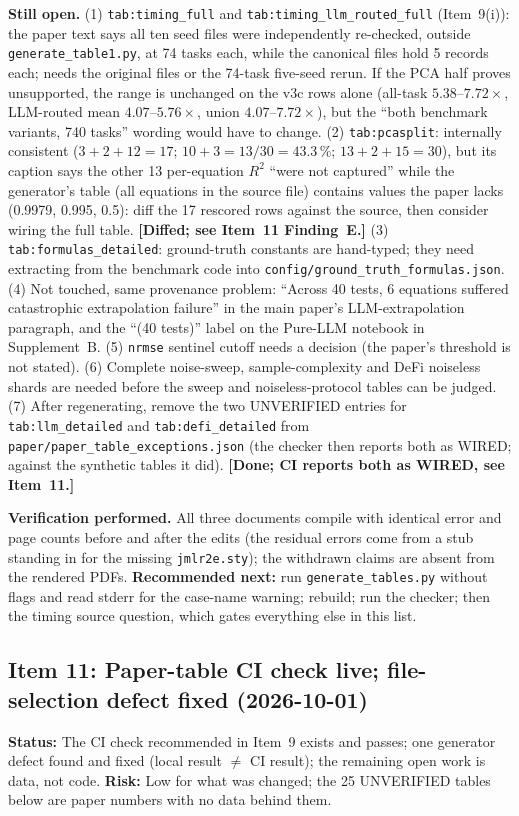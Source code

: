 \documentclass[11pt]{article}
\begin{document}
\textbf{Still open.} (1) \texttt{tab:timing\_full} and \texttt{tab:timing\_llm\_routed\_full} (Item~9(i)): the paper text says all ten
seed files were independently re-checked, outside \texttt{generate\_table1.py}, at 74 tasks each, while the canonical files hold 5 records each;
needs the original files or the 74-task five-seed rerun. If the PCA half proves unsupported, the range is unchanged on the
v3c rows alone (all-task $5.38$--$7.72\times$, LLM-routed mean $4.07$--$5.76\times$, union $4.07$--$7.72\times$), but the ``both
benchmark variants, 740 tasks'' wording would have to change. (2) \texttt{tab:pcasplit}: internally consistent ($3+2+12=17$;
$10+3=13/30=43.3\,\%$; $13+2+15=30$), but its caption says the other 13 per-equation $R^2$ ``were not captured'' while the
generator's table (all equations in the source file) contains values the paper lacks (0.9979, 0.995, 0.5): diff the 17 rescored
rows against the source, then consider wiring the full table. \textbf{[Diffed; see Item~11 Finding~E.]} (3) \texttt{tab:formulas\_detailed}: ground-truth constants are hand-typed;
they need extracting from the benchmark code into \texttt{config/ground\_truth\_formulas.json}. (4) Not touched, same provenance
problem: ``Across 40 tests, 6 equations suffered catastrophic extrapolation failure'' in the main paper's LLM-extrapolation
paragraph, and the ``(40 tests)'' label on the Pure-LLM notebook in Supplement~B. (5) \texttt{nrmse} sentinel cutoff needs a
decision (the paper's threshold is not stated). (6) Complete noise-sweep, sample-complexity and DeFi noiseless shards are needed before
the sweep and noiseless-protocol tables can be judged. (7) After regenerating, remove the two UNVERIFIED entries for
\texttt{tab:llm\_detailed} and \texttt{tab:defi\_detailed} from \texttt{paper/paper\_table\_exceptions.json} (the checker then reports
both as WIRED; against the synthetic tables it did). \textbf{[Done; CI reports both as WIRED, see Item~11.]}

\textbf{Verification performed.} All three documents compile with identical error and page counts before and after the edits
(the residual errors come from a stub standing in for the missing \texttt{jmlr2e.sty}); the withdrawn claims are absent from the
rendered PDFs. \textbf{Recommended next:} run \texttt{generate\_tables.py} without flags and read stderr for the case-name warning;
rebuild; run the checker; then the timing source question, which gates everything else in this list.

\subsection*{Item 11: Paper-table CI check live; file-selection defect fixed (2026-10-01)}
\textbf{Status:} The CI check recommended in Item~9 exists and passes; one generator defect found and fixed
(local result $\ne$ CI result); the remaining open work is data, not code. \textbf{Risk:} Low for what was
changed; the 25 UNVERIFIED tables below are paper numbers with no data behind them.
\end{document}
